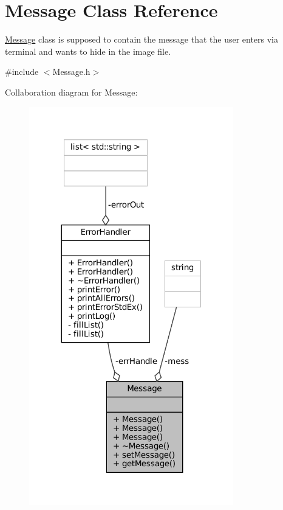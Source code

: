\hypertarget{classMessage}{}\section{Message Class Reference}
\label{classMessage}


\mbox{\hyperlink{classMessage}{Message}} class is supposed to contain the message that the user enters via terminal and wants to hide in the image file.  




{\ttfamily \#include $<$Message.\+h$>$}



Collaboration diagram for Message\+:\nopagebreak
\begin{figure}[H]
\begin{center}
\leavevmode
\includegraphics[width=252pt]{classMessage__coll__graph}
\end{center}
\end{figure}
